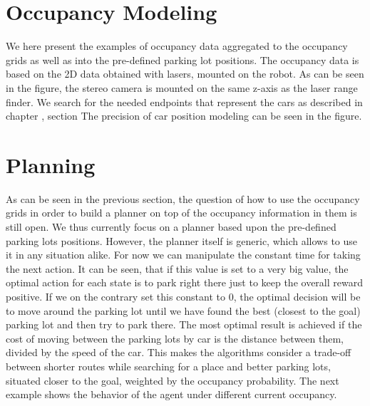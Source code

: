 
\section{Occupancy Modeling}\label{sec:occupancy_modeling}
We here present the examples of occupancy data aggregated to the occupancy grids as well as into the pre-defined parking lot positions. The occupancy data is based on the 2D data obtained with lasers, mounted on the robot.  As can be seen in the figure, the stereo camera is mounted on the same z-axis as the laser range finder. We search for the needed endpoints that represent the cars as described in chapter , section 
The precision of car position modeling can be seen in the figure. 

\section{Planning}\label{sec:planning}
As can be seen in the previous section, the question of how to use the occupancy grids in order to build a planner on top of the occupancy information in them is still open. We thus currently focus on a planner based upon the pre-defined parking lots positions. However, the planner itself is generic, which allows to use it in any situation alike. For now we can manipulate the constant time for taking the next action. It can be seen, that if this value is set to a very big value, the optimal action for each state is to park right there just to keep the overall reward positive. If we on the contrary set this constant to 0, the optimal decision will be to move around the parking lot until we have found the best (closest to the goal) parking lot and then try to park there.
The most optimal result is achieved if the cost of moving between the parking lots by car is the distance between them, divided by the speed of the car. This makes the algorithms consider a trade-off between shorter routes while searching for a place and better parking lots, situated closer to the goal, weighted by the occupancy probability.
The next example shows the behavior of the agent under different current occupancy.
